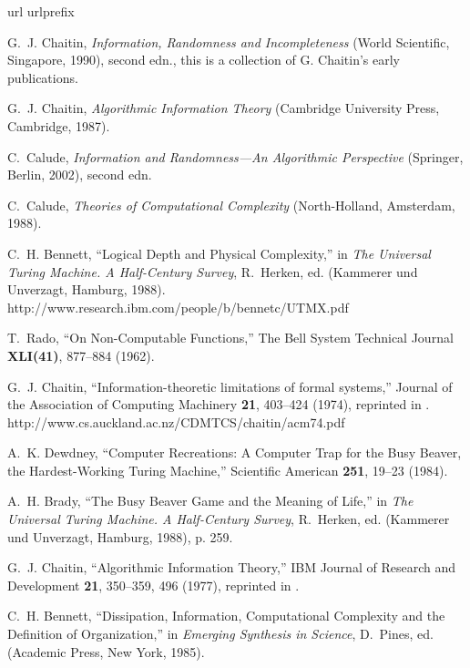 \documentclass[rmp,amssymb,showpacs,showkeys,12pt,preprint]{revtex4}
\begin{document}
\begin{thebibliography}{10}
\newcommand{\enquote}[1]{``#1''}
\expandafter\ifx\csname url\endcsname\relax
  \def\url#1{{#1}}\fi
\expandafter\ifx\csname urlprefix\endcsname\relax\def\urlprefix{}\fi

G.~J. Chaitin, {\em Information, Randomness and Incompleteness\/} (World
  Scientific, Singapore, 1990), second edn., this is a collection of G.
  Chaitin's early publications.

G.~J. Chaitin, {\em Algorithmic Information Theory\/} (Cambridge University
  Press, Cambridge, 1987).

C.~Calude, {\em Information and Randomness---An Algorithmic Perspective\/}
  (Springer, Berlin, 2002), second edn.

C.~Calude, {\em Theories of Computational Complexity\/} (North-Holland,
  Amsterdam, 1988).

C.~H. Bennett, \enquote{Logical Depth and Physical Complexity,} in {\em The
  Universal Turing Machine. A Half-Century Survey\/}, R.~Herken, ed.  (Kammerer
  und Unverzagt, Hamburg, 1988).
\newline http://www.research.ibm.com/people/b/bennetc/UTMX.pdf

T.~Rado, \enquote{On Non-Computable Functions,} The Bell System Technical
  Journal {\bf XLI(41)}, 877--884 (1962).

G.~J. Chaitin, \enquote{Information-theoretic limitations of formal systems,}
  Journal of the Association of Computing Machinery {\bf 21}, 403--424 (1974),
  reprinted in \cite{chaitin2}.
\newline http://www.cs.auckland.ac.nz/CDMTCS/chaitin/acm74.pdf

A.~K. Dewdney, \enquote{Computer Recreations: A Computer Trap for the Busy
  Beaver, the Hardest-Working {T}uring Machine,} Scientific American {\bf 251},
  19--23 (1984).

A.~H. Brady, \enquote{The Busy Beaver Game and the Meaning of Life,} in {\em
  The Universal Turing Machine. A Half-Century Survey\/}, R.~Herken, ed.
  (Kammerer und Unverzagt, Hamburg, 1988), p. 259.

G.~J. Chaitin, \enquote{Algorithmic Information Theory,} IBM Journal of
  Research and Development {\bf 21}, 350--359, 496 (1977), reprinted in
  \cite{chaitin2}.

C.~H. Bennett, \enquote{Dissipation, Information, Computational Complexity and
  the Definition of Organization,} in {\em Emerging Synthesis in Science\/},
  D.~Pines, ed.  (Academic Press, New York, 1985).


\end{thebibliography}
\end{document}
